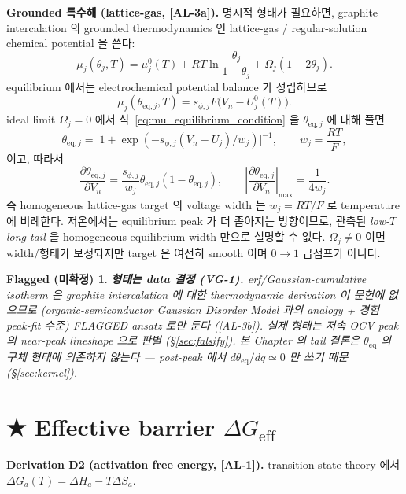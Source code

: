 \documentclass[11pt,a4paper]{article}
\newtheorem*{flagbox}{Flagged (미확정)}
\newcommand{\eff}{\mathrm{eff}}
\newcommand{\eq}{\mathrm{eq}}
\newcommand{\AL}[1]{\textsf{[AL-#1]}}
\begin{document}
\textbf{Grounded 특수해 (lattice-gas, \AL{3a}).} 명시적 형태가 필요하면, graphite
intercalation 의 grounded thermodynamics 인 lattice-gas / regular-solution chemical
potential \cite{mckinnon1983,bazant2013} 을 쓴다:
\begin{equation}
\mu_j(\theta_j,T)
=
\mu_j^0(T)
+RT\ln\frac{\theta_j}{1-\theta_j}
+\Omega_j(1-2\theta_j).
\label{eq:mu_regular_solution}
\end{equation}
equilibrium 에서는 electrochemical potential balance 가 성립하므로
\begin{equation}
\mu_j(\theta_{\eq,j},T)=s_{\phi,j}F\big(V_n-U_j^0(T)\big).
\label{eq:mu_equilibrium_condition}
\end{equation}
ideal limit $\Omega_j=0$ 에서 식~\eqref{eq:mu_equilibrium_condition} 을 $\theta_{\eq,j}$ 에 대해
풀면
\begin{equation}
\theta_{\eq,j}
=
\big[1+\exp(-s_{\phi,j}(V_n-U_j)/w_j)\big]^{-1},
\qquad
w_j=\frac{RT}{F},
\label{eq:latticegas}
\end{equation}
이고, 따라서
\begin{equation}
\frac{\partial\theta_{\eq,j}}{\partial V_n}
=
\frac{s_{\phi,j}}{w_j}\theta_{\eq,j}(1-\theta_{\eq,j}),
\qquad
\left|\frac{\partial\theta_{\eq,j}}{\partial V_n}\right|_\mathrm{max}
=
\frac{1}{4w_j}.
\label{eq:thetaeq_derivative}
\end{equation}
즉 homogeneous lattice-gas target 의 voltage width 는 $w_j=RT/F$ 로 temperature 에 비례한다.
저온에서는 equilibrium peak 가 더 좁아지는 방향이므로, 관측된 \emph{low-$T$ long tail} 을
homogeneous equilibrium width 만으로 설명할 수 없다. $\Omega_j\ne0$ 이면 width/형태가 보정되지만
target 은 여전히 smooth 이며 $0\!\to\!1$ 급점프가 아니다.
\begin{flagbox}
\textbf{형태는 data 결정 (VG-1).} erf/Gaussian-cumulative isotherm 은 graphite
intercalation 에 대한 thermodynamic derivation 이 문헌에 없으므로 (organic-semiconductor
Gaussian Disorder Model \cite{baessler1993} 과의 analogy + 경험 peak-fit 수준) FLAGGED
ansatz 로만 둔다 (\AL{3b}). 실제 형태는 저속 OCV peak 의 near-peak lineshape 으로 판별
(\S\ref{sec:falsify}). 본 Chapter 의 tail 결론은 $\theta_\eq$ 의 \emph{구체 형태에
의존하지 않는다} — post-peak 에서 $d\theta_\eq/dq\simeq0$ 만 쓰기 때문 (\S\ref{sec:kernel}).
\end{flagbox}

\section{★ Effective barrier $\Delta G_\eff$}\label{sec:barrier}
\textbf{Derivation D2 (activation free energy, \AL{1}).} transition-state theory
\cite{eyring1935,eyringchemrev1935} 에서 $\Delta G_a(T)=\Delta H_a-T\Delta S_a$.
\end{document}
